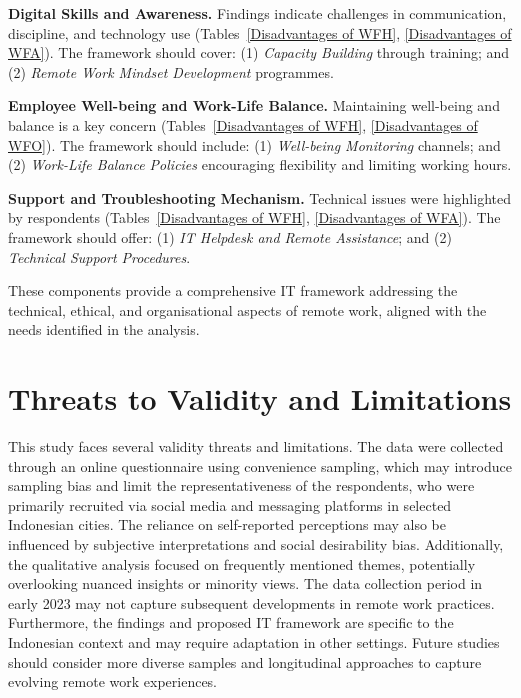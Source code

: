 \documentclass[conference]{IEEEtran}
\begin{document}
\textbf{Digital Skills and Awareness.}
Findings indicate challenges in communication, discipline, and technology use (Tables~\ref{Disadvantages of WFH}, \ref{Disadvantages of WFA}). The framework should cover: (1) \textit{Capacity Building} through training; and (2) \textit{Remote Work Mindset Development} programmes.

\textbf{Employee Well-being and Work-Life Balance.}
Maintaining well-being and balance is a key concern (Tables~\ref{Disadvantages of WFH}, \ref{Disadvantages of WFO}). The framework should include: (1) \textit{Well-being Monitoring} channels; and (2) \textit{Work-Life Balance Policies} encouraging flexibility and limiting working hours.

\textbf{Support and Troubleshooting Mechanism.}
Technical issues were highlighted by respondents (Tables~\ref{Disadvantages of WFH}, \ref{Disadvantages of WFA}). The framework should offer: (1) \textit{IT Helpdesk and Remote Assistance}; and (2) \textit{Technical Support Procedures}.


These components provide a comprehensive IT framework addressing the technical, ethical, and organisational aspects of remote work, aligned with the needs identified in the analysis.


\section{Threats to Validity and Limitations}

This study faces several validity threats and limitations. The data were collected through an online questionnaire using convenience sampling, which may introduce sampling bias and limit the representativeness of the respondents, who were primarily recruited via social media and messaging platforms in selected Indonesian cities. The reliance on self-reported perceptions may also be influenced by subjective interpretations and social desirability bias. Additionally, the qualitative analysis focused on frequently mentioned themes, potentially overlooking nuanced insights or minority views. The data collection period in early 2023 may not capture subsequent developments in remote work practices. Furthermore, the findings and proposed IT framework are specific to the Indonesian context and may require adaptation in other settings. Future studies should consider more diverse samples and longitudinal approaches to capture evolving remote work experiences.
\end{document}
